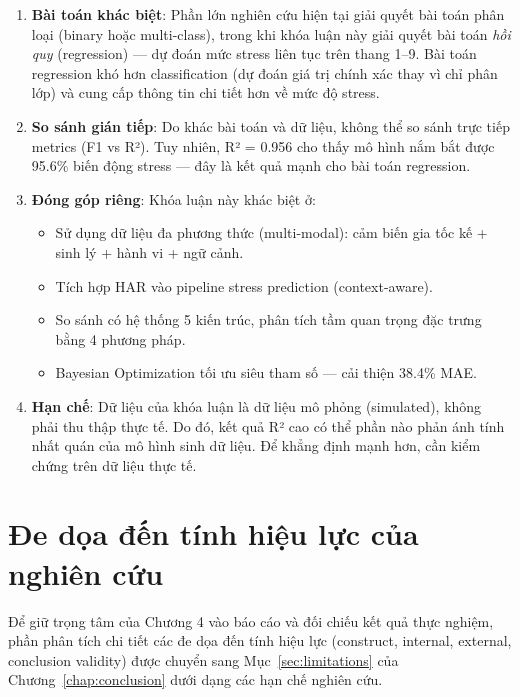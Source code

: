 \begin{enumerate}
    \item \textbf{Bài toán khác biệt}: Phần lớn nghiên cứu hiện tại giải quyết bài toán phân loại (binary hoặc multi-class), trong khi khóa luận này giải quyết bài toán \textit{hồi quy} (regression) — dự đoán mức stress liên tục trên thang 1--9. Bài toán regression khó hơn classification (dự đoán giá trị chính xác thay vì chỉ phân lớp) và cung cấp thông tin chi tiết hơn về mức độ stress.
    
    \item \textbf{So sánh gián tiếp}: Do khác bài toán và dữ liệu, không thể so sánh trực tiếp metrics (F1 vs R²). Tuy nhiên, R² = 0.956 cho thấy mô hình nắm bắt được 95.6\% biến động stress — đây là kết quả mạnh cho bài toán regression.
    
    \item \textbf{Đóng góp riêng}: Khóa luận này khác biệt ở:
    \begin{itemize}
        \item Sử dụng dữ liệu đa phương thức (multi-modal): cảm biến gia tốc kế + sinh lý + hành vi + ngữ cảnh.
        \item Tích hợp HAR vào pipeline stress prediction (context-aware).
        \item So sánh có hệ thống 5 kiến trúc, phân tích tầm quan trọng đặc trưng bằng 4 phương pháp.
        \item Bayesian Optimization tối ưu siêu tham số — cải thiện 38.4\% MAE.
    \end{itemize}
    
    \item \textbf{Hạn chế}: Dữ liệu của khóa luận là dữ liệu mô phỏng (simulated), không phải thu thập thực tế. Do đó, kết quả R² cao có thể phần nào phản ánh tính nhất quán của mô hình sinh dữ liệu. Để khẳng định mạnh hơn, cần kiểm chứng trên dữ liệu thực tế.
\end{enumerate}


\section{Đe dọa đến tính hiệu lực của nghiên cứu}
\label{sec:validity_threats}

Để giữ trọng tâm của Chương 4 vào báo cáo và đối chiếu kết quả thực nghiệm, phần phân tích chi tiết các đe dọa đến tính hiệu lực (construct, internal, external, conclusion validity) được chuyển sang Mục~\ref{sec:limitations} của Chương~\ref{chap:conclusion} dưới dạng các hạn chế nghiên cứu.

